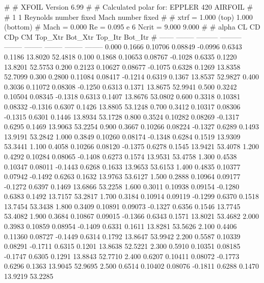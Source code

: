 #  
#       XFOIL         Version 6.99
#  
# Calculated polar for: EPPLER 420 AIRFOIL                              
#  
# 1 1 Reynolds number fixed          Mach number fixed         
#  
# xtrf =   1.000 (top)        1.000 (bottom)  
# Mach =   0.000     Re =     0.095 e 6     Ncrit =   9.000  9.000
#  
#   alpha    CL        CD       CDp       CM     Top_Xtr  Bot_Xtr  Top_Itr  Bot_Itr
#  ------ -------- --------- --------- -------- -------- -------- -------- --------
   0.000   0.1666   0.10706   0.08849  -0.0996   0.6343   0.1186  13.8020  52.4818
   0.100   0.1868   0.10653   0.08767  -0.1028   0.6335   0.1220  13.8201  52.5753
   0.200   0.2123   0.10627   0.08677  -0.1075   0.6328   0.1269  13.8358  52.7099
   0.300   0.2800   0.11084   0.08417  -0.1214   0.6319   0.1367  13.8537  52.9827
   0.400   0.3036   0.11072   0.08308  -0.1250   0.6313   0.1371  13.8675  52.9941
   0.500   0.3242   0.10504   0.08345  -0.1318   0.6313   0.1407  13.8676  53.0802
   0.600   0.3318   0.10381   0.08332  -0.1316   0.6307   0.1426  13.8805  53.1248
   0.700   0.3412   0.10317   0.08306  -0.1315   0.6301   0.1446  13.8934  53.1728
   0.800   0.3524   0.10282   0.08269  -0.1317   0.6295   0.1469  13.9063  53.2254
   0.900   0.3667   0.10266   0.08224  -0.1327   0.6289   0.1493  13.9191  53.2842
   1.000   0.3849   0.10260   0.08174  -0.1348   0.6284   0.1519  13.9309  53.3441
   1.100   0.4058   0.10266   0.08120  -0.1375   0.6278   0.1545  13.9421  53.4078
   1.200   0.4292   0.10284   0.08065  -0.1408   0.6273   0.1574  13.9531  53.4758
   1.300   0.4538   0.10347   0.08011  -0.1443   0.6268   0.1633  13.9653  53.6153
   1.400   0.4835   0.10377   0.07942  -0.1492   0.6263   0.1632  13.9763  53.6127
   1.500   0.2888   0.10964   0.09177  -0.1272   0.6397   0.1469  13.6866  53.2258
   1.600   0.3011   0.10938   0.09154  -0.1280   0.6383   0.1492  13.7157  53.2817
   1.700   0.3184   0.10914   0.09119  -0.1299   0.6370   0.1518  13.7454  53.3438
   1.800   0.3409   0.10891   0.09073  -0.1327   0.6356   0.1546  13.7745  53.4082
   1.900   0.3684   0.10867   0.09015  -0.1366   0.6343   0.1571  13.8021  53.4682
   2.000   0.3983   0.10859   0.08954  -0.1409   0.6331   0.1611  13.8281  53.5626
   2.100   0.4406   0.11360   0.08727  -0.1449   0.6314   0.1792  13.8647  53.9942
   2.200   0.5587   0.10339   0.08291  -0.1711   0.6315   0.1201  13.8638  52.5221
   2.300   0.5910   0.10351   0.08185  -0.1747   0.6305   0.1291  13.8843  52.7710
   2.400   0.6207   0.10411   0.08072  -0.1773   0.6296   0.1363  13.9045  52.9695
   2.500   0.6514   0.10402   0.08076  -0.1811   0.6288   0.1470  13.9219  53.2285
